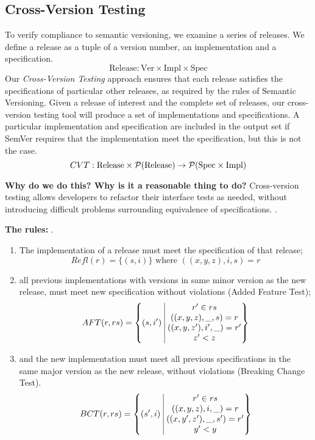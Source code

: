 \subsection{Cross-Version Testing}
To verify compliance to semantic versioning, we examine a series of
releases.
%
We define a release as a tuple of a version number, an implementation
and a specification.
$$ \text{Release} : \text{Ver} \times \text{Impl} \times \text{Spec} $$
%
Our \emph{Cross-Version Testing} approach ensures that each release
satisfies the specifications of particular other releases, as required
by the rules of Semantic Versioning. Given a release of interest and
the complete set of releases, our cross-version testing tool will
produce a set of implementations and specifications. A particular
implementation and specification are included in the output set if
SemVer requires that the implementation meet the specification, but
this is not the case.
$$
CVT : \text{Release} \times \mathcal{P}(\text{Release}) \to \mathcal{P}(\text{Spec} \times \text{Impl})
$$

{\bf Why do we do this? Why is it a reasonable thing to do?}
Cross-version testing allows developers to refactor their interface
tests as needed, without introducing difficult problems surrounding
equivalence of specifications. .

{\bf The rules:} .

\begin{enumerate}
\item The implementation of a release must meet the specification of
  that release;
  $$ Refl(r) = \{(s, i)\} \text{ where } ((x,y,z), i, s) = r $$

    \item all previous implementations with versions in same minor version as the
    new release, must meet new specification without violations (Added Feature
    Test);
    $$AFT(r, rs) = \left\{ (s, i')\ \vline\ 
        \begin{matrix}
            r' \in rs \\
        ((x,y,z), \_, s) = r \\ 
        ((x,y,z'), i', \_) = r'\\
        z' < z \\
        \end{matrix}
    \right\}$$

    \item and the new implementation must meet all previous specifications in the same major version as the new
        release, without violations (Breaking Change Test).
    $$BCT(r, rs) = \left\{ (s', i)\ \vline\ 
        \begin{matrix}
            r' \in rs \\
        ((x, y, z), i, \_) = r \\ 
        ((x, y', z'), \_, s') = r'\\
        y' < y \\
        \end{matrix}
    \right\}$$
\end{enumerate}

